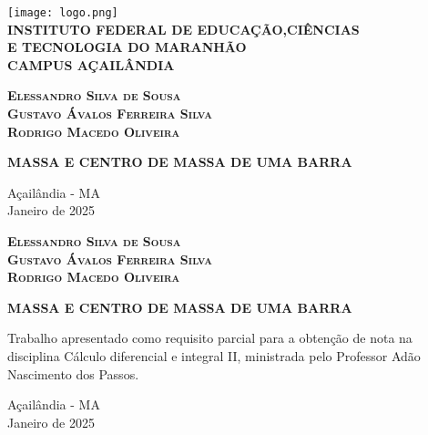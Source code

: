 \documentclass[12pt,a4paper]{report}
\begin{document}
\begin{titlepage}
    \begin{center}
        \texttt{[image: logo.png]}\\[0.5cm] %
        \textbf{
        {\large INSTITUTO FEDERAL DE EDUCAÇÃO,CIÊNCIAS} \\[0.25cm]
        {\large E TECNOLOGIA DO MARANHÃO} \\[0.25cm]
        {\large CAMPUS AÇAILÂNDIA} \\[2.5cm]
        }

        \textbf{
        {\large  { \scshape Elessandro Silva de Sousa\\ Gustavo Ávalos Ferreira Silva\\ Rodrigo Macedo Oliveira }} \\[3cm]
        }
        
        \textbf{
        {\large  MASSA E CENTRO DE MASSA DE UMA BARRA} 
        }
        
        \vfill
        {\large Açailândia - MA} \\[0.25cm]
        {\large Janeiro de 2025}
    \end{center}
\end{titlepage}

\begin{titlepage}
    \begin{center}

        \textbf{
        {\large { \scshape Elessandro Silva de Sousa\\ Gustavo Ávalos Ferreira Silva\\ Rodrigo Macedo Oliveira } } \\[4cm]
        }

        \textbf{
        {\large MASSA E CENTRO DE MASSA DE UMA BARRA} \\[4cm]
        }
    \end{center}

        \begin{flushright}
            \parbox{7.9cm}{ %
            Trabalho apresentado como requisito parcial para 
            a obtenção de nota na disciplina Cálculo 
            diferencial e integral II, ministrada pelo 
            Professor Adão Nascimento dos Passos.
            }
        \end{flushright}

    \begin{center}
        \vfill
        {\large Açailândia - MA} \\[0.25cm]
        {\large Janeiro de 2025}
    \end{center}
\end{titlepage}
\end{document}
